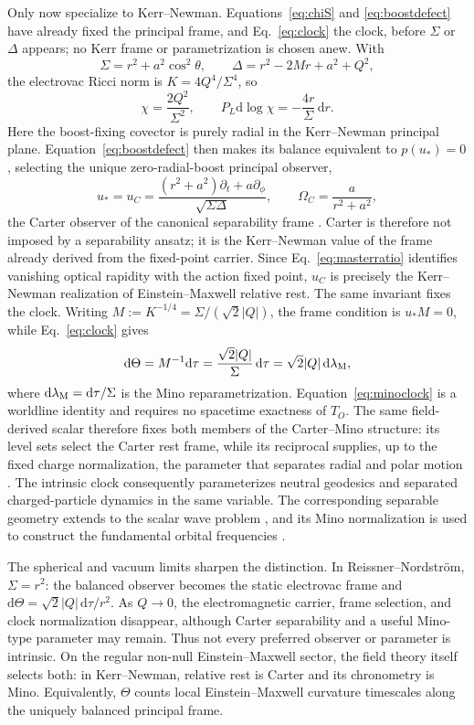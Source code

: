 \documentclass[aps,prl,reprint]{revtex4-2}
\newcommand{\dd}{\mathrm d}
\begin{document}
Only now specialize to Kerr--Newman. Equations~\eqref{eq:chiS} and \eqref{eq:boostdefect} have already fixed the principal frame, and Eq.~\eqref{eq:clock} the clock, before $\Sigma$ or $\Delta$ appears; no Kerr frame or parametrization is chosen anew. With
\[
\Sigma=r^2+a^2\cos^2\theta,\qquad
\Delta=r^2-2Mr+a^2+Q^2,
\]
the electrovac Ricci norm is \(K=4Q^4/\Sigma^4\), so
\[
\chi=\frac{2Q^2}{\Sigma^2},
\qquad
P_L\dd\log\chi=-\frac{4r}{\Sigma}\,\dd r .
\]
Here the boost-fixing covector is purely radial in the Kerr--Newman principal plane. Equation~\eqref{eq:boostdefect} then makes its balance equivalent to $p(u_*)=0$, selecting the unique zero-radial-boost principal observer,
\[
u_*=u_C
=\frac{(r^2+a^2)\partial_t+a\partial_\phi}
{\sqrt{\Sigma\Delta}},
\qquad
\Omega_C=\frac{a}{r^2+a^2},
\]
the Carter observer of the canonical separability frame \cite{CarterKN,CarterSep}. Carter is therefore not imposed by a separability ansatz; it is the Kerr--Newman value of the frame already derived from the fixed-point carrier. Since Eq.~\eqref{eq:masterratio} identifies vanishing optical rapidity with the action fixed point, $u_C$ is precisely the Kerr--Newman realization of Einstein--Maxwell relative rest. The same invariant fixes the clock. Writing $M:=K^{-1/4}=\Sigma/(\sqrt2|Q|)$, the frame condition is $u_*M=0$, while Eq.~\eqref{eq:clock} gives
\begin{equation}
\dd\Theta
=M^{-1}\dd\tau
=\frac{\sqrt2|Q|}{\Sigma}\,\dd\tau
=\sqrt2|Q|\,\dd\lambda_{\rm M},
\label{eq:minoclock}
\end{equation}
where $\dd\lambda_{\rm M}=\dd\tau/\Sigma$ is the Mino reparametrization. Equation~\eqref{eq:minoclock} is a worldline identity and requires no spacetime exactness of $T_O$. The same field-derived scalar therefore fixes both members of the Carter--Mino structure: its level sets select the Carter rest frame, while its reciprocal supplies, up to the fixed charge normalization, the parameter that separates radial and polar motion \cite{CarterKN,HackmannXu}. The intrinsic clock consequently parameterizes neutral geodesics and separated charged-particle dynamics in the same variable. The corresponding separable geometry extends to the scalar wave problem \cite{CarterSep}, and its Mino normalization is used to construct the fundamental orbital frequencies \cite{FujitaHikida}.

The spherical and vacuum limits sharpen the distinction. In Reissner--Nordstr\"om, $\Sigma=r^2$: the balanced observer becomes the static electrovac frame and $\dd\Theta=\sqrt2|Q|\,\dd\tau/r^2$. As $Q\to0$, the electromagnetic carrier, frame selection, and clock normalization disappear, although Carter separability and a useful Mino-type parameter may remain. Thus not every preferred observer or parameter is intrinsic. On the regular non-null Einstein--Maxwell sector, the field theory itself selects both: in Kerr--Newman, relative rest is Carter and its chronometry is Mino. Equivalently, $\Theta$ counts local Einstein--Maxwell curvature timescales along the uniquely balanced principal frame.
\end{document}
